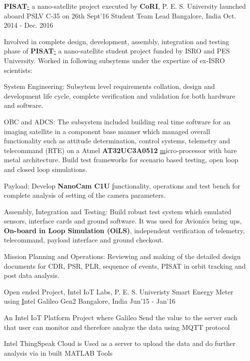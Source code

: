 
\begin{cventries}
	\cventry
	{\textbf{PISAT}\href{http://pisat.pes.edu/}- a nano-satellite project executed by \textbf{CoRI}\href{http://cori.pes.edu/}, P. E. S. University launched aboard PSLV C-35 on 26th Sept'16}
	{Student Team Lead}
	{Bangalore, India}
	{Oct. 2014 - Dec. 2016}
	{
		\begin{cvitems}
		\item{Involved in complete design, development, assembly, integration and testing phase of \textbf{PISAT}\href{https://www.isro.gov.in/Spacecraft/pisat} - a nano-satellite student project funded by ISRO and PES University. Worked in following subsytems under the expertize of ex-ISRO scientists:}
		\item{System Engineering: Subsytem level requirements collation, design and development life cycle, complete verification and validation for both hardware and software.}
		\item{OBC and ADCS: The subsystem included building real time software for an imaging satellite in a component base manner which managed overall functionality such as attitude determination, control systems, telemetry and telecommand (RTE) on a Atmel \textbf{AT32UC3A0512 }\href{https://www.microchip.com/wwwproducts/en/AT32UC3A0512} micro-processor with bare metal architecture. Build test frameworks for scenario based testing, open loop and closed loop simulations.}
		\item{Payload: Develop \textbf{NanoCam C1U }\href{https://gomspace.com/UserFiles/Subsystems/datasheet/gs-ds-nanocam-c1u-17.pdf} functionality, operations and test bench for complete analysis of setting of the camera parameters.}
		\item{Assembly, Integration and Testing: Build robust test system which emulated sensors, interface cards and ground software. It was used for Avionics bring ups, \textbf{On-board in Loop Simulation (OiLS)}, independent verification of telemetry, telecommand, payload interface and ground checkout.}
		\item{Mission Planning and Operations: Reviewing and making of the detailed design documents for CDR, PSR, PLR, sequence of events, PISAT in orbit tracking and post data analysis.}
		\end{cvitems}
	}
\end{cventries}
\begin{cventries}
	\cventry
	{Open ended Project, Intel IoT Labs, P. E. S. Univeristy}
	{Smart Energy Meter using \href{https://www.arduino.cc/en/ArduinoCertified/IntelGalileoGen2}Intel Galileo Gen2}
	{Bangalore, India}
	{Jun'15 - Jan'16}
	{
		\begin{cvitems}
		\item{An Intel IoT Platform Project where Galileo Send the value to the server such that user can monitor and therefore analyze the data using MQTT protocol}
		\item{Intel ThingSpeak Cloud is Used as a server to upload the data and do further analysis via in built MATLAB Tools}
		\end{cvitems}
	}
\end{cventries}
